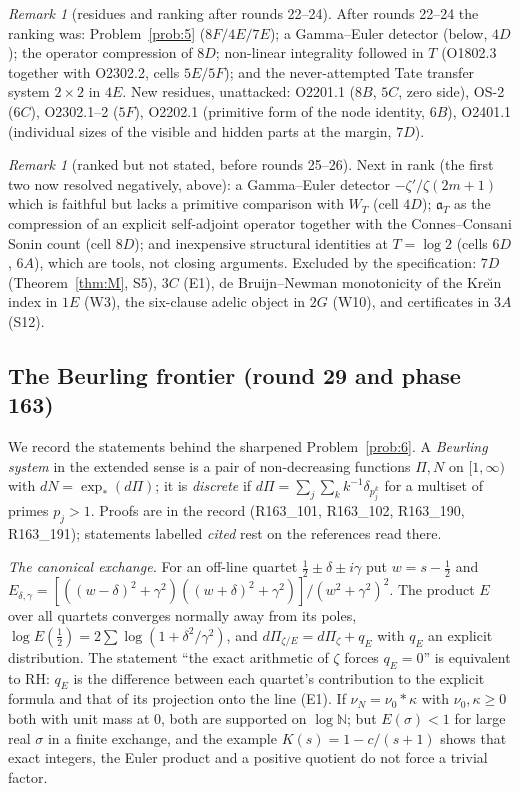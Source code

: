 \documentclass[11pt]{amsart}
\theoremstyle{definition}
\theoremstyle{remark}
\newtheorem{remark}[theorem]{Remark}
\newcommand{\N}{\mathbb N}
\begin{document}
\begin{remark}[residues and ranking after rounds 22--24]
After rounds 22--24 the ranking was: Problem~\ref{prob:5} ($8F/4E/7E$); a Gamma--Euler detector (below, $4D$);
the operator compression of $8D$; non-linear integrality followed in $T$ (O1802.3 together with O2302.2, cells
$5E/5F$); and the never-attempted Tate transfer system $2\times2$ in $4E$. New residues, unattacked:
O2201.1 ($8B$, $5C$, zero side), OS-2 ($6C$), O2302.1--2 ($5F$), O2202.1 (primitive form of the node
identity, $6B$), O2401.1 (individual sizes of the visible and hidden parts at the margin, $7D$).
\end{remark}

\begin{remark}[ranked but not stated, before rounds 25--26]
Next in rank (the first two now resolved negatively, above): a Gamma--Euler detector $-\zeta'/\zeta(2m+1)$ which is faithful but lacks a primitive
comparison with $W_T$ (cell $4D$); $\mathfrak a_T$ as the compression of an explicit self-adjoint operator
together with the Connes--Consani Sonin count (cell $8D$); and inexpensive structural identities at
$T=\log2$ (cells $6D$, $6A$), which are tools, not closing arguments. Excluded by the specification:
$7D$ (Theorem~\ref{thm:M}, S5), $3C$ (E1), de Bruijn--Newman monotonicity of the Kre\u{\i}n index in $1E$
(W3), the six-clause adelic object in $2G$ (W10), and certificates in $3A$ (S12).
\end{remark}

\subsection{The Beurling frontier (round 29 and phase 163)}\label{subsec:beurling}
We record the statements behind the sharpened Problem~\ref{prob:6}. A \emph{Beurling system} in the extended
sense is a pair of non-decreasing functions $\Pi,N$ on $[1,\infty)$ with $dN=\exp_*(d\Pi)$; it is \emph{discrete} if
$d\Pi=\sum_j\sum_k k^{-1}\delta_{p_j^k}$ for a multiset of primes $p_j>1$. Proofs are in the record (R163\_101,
R163\_102, R163\_190, R163\_191); statements labelled \emph{cited} rest on the references read there.

\emph{The canonical exchange.} For an off-line quartet $\frac12\pm\delta\pm i\gamma$ put $w=s-\frac12$ and
$E_{\delta,\gamma}=[((w-\delta)^2+\gamma^2)((w+\delta)^2+\gamma^2)]/(w^2+\gamma^2)^2$. The product $E$ over all quartets
converges normally away from its poles, $\log E(\frac12)=2\sum\log(1+\delta^2/\gamma^2)$, and
$d\Pi_{\zeta/E}=d\Pi_\zeta+q_E$ with $q_E$ an explicit distribution. The statement ``the exact arithmetic of $\zeta$
forces $q_E=0$'' is equivalent to RH: $q_E$ is the difference between each quartet's contribution to the explicit
formula and that of its projection onto the line (E1). If $\nu_N=\nu_0*\kappa$ with $\nu_0,\kappa\ge0$ both with
unit mass at $0$, both are supported on $\log\N$; but $E(\sigma)<1$ for large real $\sigma$ in a finite exchange, and
the example $K(s)=1-c/(s+1)$ shows that exact integers, the Euler product and a positive quotient do not force a
trivial factor.
\end{document}
